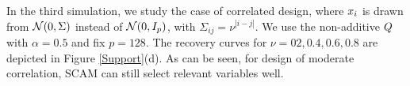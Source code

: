 In the third simulation, we study the case of correlated design, where
$x_{i}$ is drawn from $\mathcal{N}(0,\Sigma)$
instead of $\mathcal{N}(0,I_{p})$, with
$\Sigma_{ij}=\nu^{|i-j|}$. We use the non-additive $Q$ with
$\alpha=0.5$ and fix $p=128$.  The recovery curves for $\nu=02, 0.4,
0.6, 0.8$ are depicted in Figure \ref{Support}(d). As can be seen, for
design of moderate correlation, SCAM can still select relevant
variables well.





